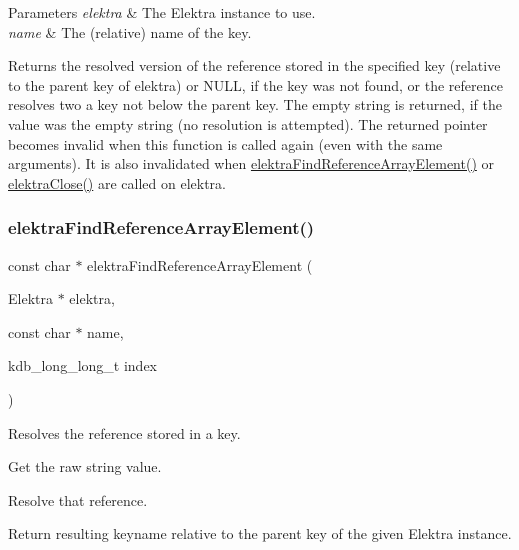 \begin{DoxyParams}{Parameters}
{\em elektra} & The Elektra instance to use. \\
\hline
{\em name} & The (relative) name of the key. \\
\hline
\end{DoxyParams}
\begin{DoxyReturn}{Returns}
the resolved version of the reference stored in the specified key (relative to the parent key of {\ttfamily elektra}) or N\+U\+LL, if the key was not found, or the reference resolves two a key not below the parent key. The empty string is returned, if the value was the empty string (no resolution is attempted). The returned pointer becomes invalid when this function is called again (even with the same arguments). It is also invalidated when \mbox{\hyperlink{group__highlevel_ga16e022b631da118ca67901495029a844}{elektra\+Find\+Reference\+Array\+Element()}} or \mbox{\hyperlink{group__highlevel_ga9b688b7250e5f9d8ea6701cc2cc269af}{elektra\+Close()}} are called on {\ttfamily elektra}. 
\end{DoxyReturn}
\mbox{\label{group__highlevel_ga16e022b631da118ca67901495029a844}} 
\subsubsection{\texorpdfstring{elektraFindReferenceArrayElement()}{elektraFindReferenceArrayElement()}}
{\footnotesize\ttfamily const char $\ast$ elektra\+Find\+Reference\+Array\+Element (\begin{DoxyParamCaption}\item[{Elektra $\ast$}]{elektra,  }\item[{const char $\ast$}]{name,  }\item[{kdb\+\_\+long\+\_\+long\+\_\+t}]{index }\end{DoxyParamCaption})}



Resolves the reference stored in a key. 


\begin{DoxyEnumerate}
\item Get the raw string value.
\item Resolve that reference.
\item Return resulting keyname relative to the parent key of the given Elektra instance.
\end{DoxyEnumerate}

